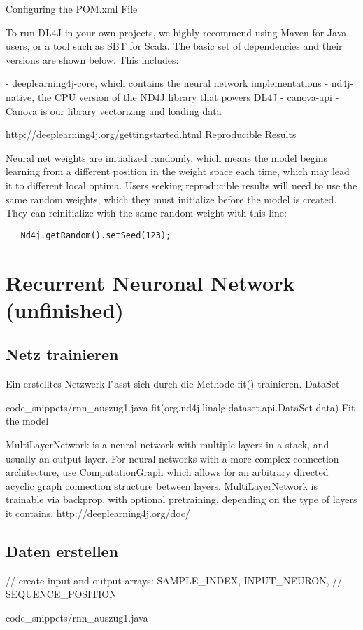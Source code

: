 {Configuring the POM.xml File

To run DL4J in your own projects, we highly recommend using Maven for Java users, or a tool such as SBT for Scala. The basic set of dependencies and their versions are shown below. This includes:

   -  deeplearning4j-core, which contains the neural network implementations
   -  nd4j-native, the CPU version of the ND4J library that powers DL4J
    - canova-api - Canova is our library vectorizing and loading data

http://deeplearning4j.org/gettingstarted.html
Reproducible Results

Neural net weights are initialized randomly, which means the model begins learning from a different position in the weight space each time, which may lead it to different local optima. Users seeking reproducible results will need to use the same random weights, which they must initialize before the model is created. They can reinitialize with the same random weight with this line:

\begin{lstlisting}
   Nd4j.getRandom().setSeed(123);
\end{lstlisting}



\section{Recurrent Neuronal Network (unfinished)}

\subsection{Netz trainieren}
Ein erstelltes Netzwerk l"asst sich durch die Methode fit() trainieren. DataSet

{code_snippets/rnn_auszug1.java}
fit(org.nd4j.linalg.dataset.api.DataSet data)
Fit the model

MultiLayerNetwork is a neural network with multiple layers in a stack, and usually an output layer. For neural networks with a more complex connection architecture, use ComputationGraph which allows for an arbitrary directed acyclic graph connection structure between layers. MultiLayerNetwork is trainable via backprop, with optional pretraining, depending on the type of layers it contains.
http://deeplearning4j.org/doc/

\subsection{Daten erstellen}
// create input and output arrays: SAMPLE\_INDEX, INPUT\_NEURON,
    // SEQUENCE\_POSITION

{code_snippets/rnn_auszug1.java}

}
